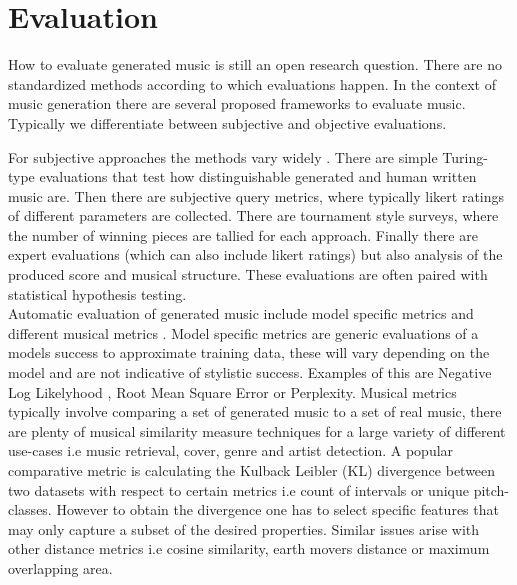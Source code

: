 \section{Evaluation}\label{section:evaluation}
How to evaluate generated music is still an open research question. There are no standardized methods according to which evaluations happen\cite{Yin_Reuben_Stepney_Collins_2023}. In the context of music generation there are several proposed frameworks to evaluate music. Typically we differentiate between subjective and objective evaluations.

For subjective approaches the methods vary widely \cite{Xiong_Wang_ai_eval_methods_2023}. There are simple Turing-type evaluations that test how distinguishable generated and human written music are. Then there are subjective query metrics, where typically likert ratings of different parameters are collected.\cite{Min_Jiang_Xia_Zhao_polyffusion_2023}  There are tournament style surveys, where the number of winning pieces are tallied for each approach.\cite{Huang_Vaswani_Uszkoreit_Shazeer_Simon_Hawthorne_Dai_Hoffman_Dinculescu_Eck_2018}\cite{Rütte_figaro_2023} Finally there are expert evaluations (which can also include likert ratings) but also analysis of the produced score and musical structure. \cite{Sturm_Ben-Tal_2016} These evaluations are often paired with statistical hypothesis testing. \cite{Rütte_figaro_2023}\\

Automatic evaluation of generated music include model specific metrics and different musical metrics \cite{Xiong_Wang_ai_eval_methods_2023}. Model specific metrics are generic evaluations of a models success to approximate training data, these will vary depending on the model and are not indicative of stylistic success. Examples of this are Negative Log Likelyhood \cite{Huang_Vaswani_Uszkoreit_Shazeer_Simon_Hawthorne_Dai_Hoffman_Dinculescu_Eck_2018}, Root Mean Square Error \cite{Rütte_figaro_2023} or Perplexity\cite{Rütte_figaro_2023}. Musical metrics typically involve comparing a set of generated music to a set of real music, there are plenty of musical similarity measure techniques\cite{Gurjar_Moon_similarity_2018} for a large variety of different use-cases i.e music retrieval, cover, genre and artist detection. A popular comparative metric is calculating the Kulback Leibler (KL) divergence between two datasets with respect to certain metrics i.e count of intervals or unique pitch-classes. However to obtain the divergence one has to select specific features that may only capture a subset of the desired properties. Similar issues arise with other distance metrics i.e cosine similarity, earth movers distance or maximum overlapping area. 

